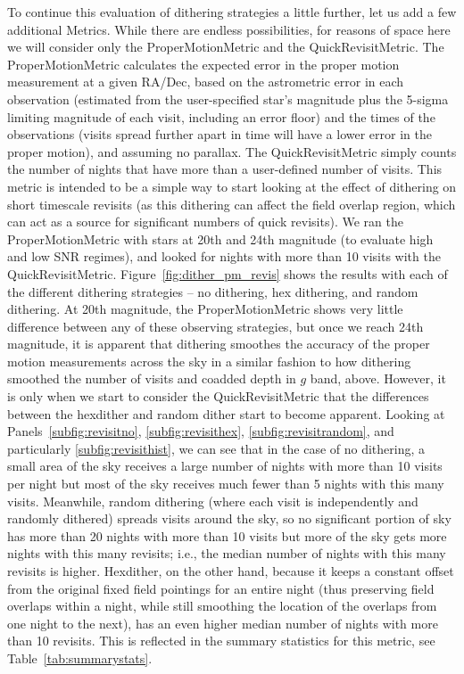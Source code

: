 \documentclass[]{spie}  %
\begin{document}
To continue this evaluation of dithering strategies a little further,
let us add a few additional Metrics. While there are endless
possibilities, for reasons of space here we will consider only the
ProperMotionMetric and the QuickRevisitMetric. The ProperMotionMetric
calculates the expected error in the proper motion measurement at a
given RA/Dec, based on the astrometric error in each observation
(estimated from the user-specified star's magnitude plus the 5-sigma
limiting magnitude of each visit, including an error floor) and the
times of the observations (visits spread further apart in time will
have a lower error in the proper motion), and assuming no parallax.  The
QuickRevisitMetric simply counts the number of nights that have more
than a user-defined number of visits. This metric is intended to be a
simple way to start looking at the effect of dithering on short
timescale revisits (as this dithering can affect the field overlap
region, which can act as a source for significant numbers of quick
revisits). We ran the ProperMotionMetric with stars at 20th and 24th
magnitude (to evaluate high and low SNR regimes), and looked for
nights with more than 10 visits with the
QuickRevisitMetric. Figure~\ref{fig:dither_pm_revis} shows the results
with each of the different dithering strategies -- no dithering, hex
dithering, and random dithering. At 20th magnitude, the
ProperMotionMetric shows very little difference between any of these
observing strategies, but once we reach 24th magnitude, it is apparent
that dithering smoothes the accuracy of the proper motion
measurements across the sky in a similar fashion to how dithering smoothed the
number of visits and coadded depth in $g$ band, above. However, it is
only when we start to consider the QuickRevisitMetric that the
differences between the hexdither and random dither start to become
apparent. Looking at Panels~\ref{subfig:revisitno},
\ref{subfig:revisithex}, \ref{subfig:revisitrandom}, and particularly
\ref{subfig:revisithist}, we can see that in the case of no dithering,
a small area of the sky receives a large number of nights with more
than 10 visits per night but most of the sky receives much fewer than 5
nights with this many visits. Meanwhile, random dithering (where
each visit is independently and randomly dithered) spreads visits
around the sky, so no significant portion of sky has more than 20
nights with more than 10 visits but more of the sky gets more nights
with this many revisits; i.e., the median number of nights with
this many revisits is higher. Hexdither, on the other hand, because it
keeps a constant offset from the original fixed field pointings for an
entire night (thus preserving field overlaps within a night, while
still smoothing the location of the overlaps from one night to the
next), has an even higher median number of nights with more than 10
revisits. This is reflected in the summary statistics for this metric,
see Table~\ref{tab:summarystats}. 
\end{document}
